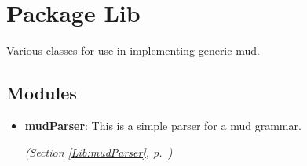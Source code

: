 %
%
%


\section{Package Lib}

    \label{Lib}
Various classes for use in implementing generic mud.



\subsection{Modules}

\begin{itemize}
\setlength{\parskip}{0ex}
\item \textbf{mudParser}: This is a simple parser for a mud grammar.



  \textit{(Section \ref{Lib:mudParser}, p.~\pageref{Lib:mudParser})}

\end{itemize}

